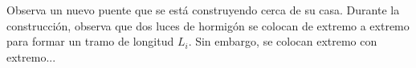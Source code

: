\item Observa un nuevo puente que se está construyendo cerca de su casa. Durante la construcción, observa que dos luces de hormigón se colocan de extremo a extremo para formar un tramo de longitud $L_i$. Sin embargo, se colocan extremo con extremo...
